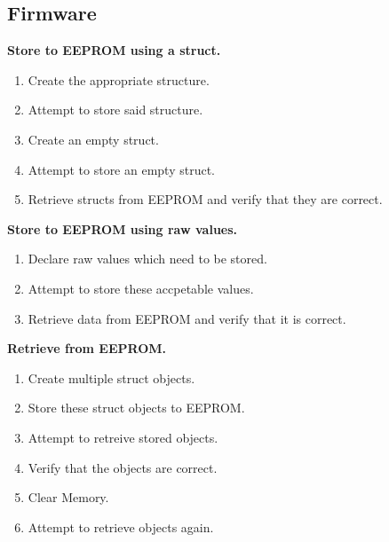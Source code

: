 \documentclass[a4paper,10pt]{article}
\begin{document}
		\subsection{Firmware}
		\textbf{Store to EEPROM using a struct.}
		\begin{enumerate}
			\item Create the appropriate structure.
			\item Attempt to store said structure.
			\item Create an empty struct.
			\item Attempt to store an empty struct.
			\item Retrieve structs from EEPROM and verify that they are correct.
		\end{enumerate}
		\textbf{Store to EEPROM using raw values.}
		\begin{enumerate}
			\item Declare raw values which need to be stored.
			\item Attempt to store these accpetable values.
			\item Retrieve data from EEPROM and verify that it is correct. 
		\end{enumerate}
		\textbf{Retrieve from EEPROM.}
		\begin{enumerate}
			\item Create multiple struct objects.
			\item Store these struct objects to EEPROM.
			\item Attempt to retreive stored objects.
			\item Verify that the objects are correct.
			\item Clear Memory.
			\item Attempt to retrieve objects again.
		\end{enumerate}
		
\end{document}
